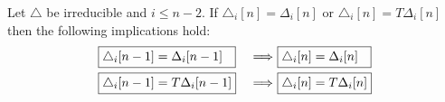 \begin{lemma}
	Let $\triangle$ be irreducible and $i \leq n-2$.
	If $\triangle_i [n] = \Delta_i [n]$ or $\triangle_i [n] = T \Delta_i [n]$ then the following implications hold:
	\begin{alignat*}{2}
	&\boxed{\triangle_i [n-1] = \Delta_i [n-1] \hspace*{7pt}}\ &\Longrightarrow\
	&\boxed{\triangle_i [n] = \Delta_i [n] \hspace*{7pt}} \\
	&\boxed{\triangle_i [n-1] = T \Delta_i [n-1]}\ &\Longrightarrow\
	&\boxed{\triangle_i [n] = T \Delta_i [n]}
	\end{alignat*}
\end{lemma}

\iffalse
\begin{proof}
	We will establish the first of these implications using proof by contradiction.
	The second is proven analogously.
	Observe that using the assumptions we have
	\begin{align*}
	(1+T) \triangle_{i-1}[n] &=
	\bd T \Delta_i [n] + \Delta_i \bd \, [n] \\ &=
	T \bd \Delta_i [n] + \bd \Delta_i [n] + \bd \Delta_i [n] + \Delta_i \bd \, [n] \\ &=
	(1+T) \bd \Delta_i [n] + (1+T) \Delta_{i-1} [n] \\ &=
	(1+T) \Delta_i \bd \, [n] + (1+T) \Delta_{i-1} [n]
	\end{align*}
	Using \eqref{e:triangle of boundary} and the definition of $\Delta_{i-1} [n]$ we have
	\begin{align*}
	(1+T) \triangle_{i-1}[n] &=
	(1+T) \sum_{\P_{n-i}^n} \left( \,
	\sum_{u \in U^1} {u.U^0} \ot {U^1} \ +
	\sum_{u \in U^0} {U^0} \ot {u.U^1} \right) \\ &+
	(1+T) \sum_{\P_{n-i+1}^n} U^0 \ot U^1.
	\end{align*}
	By \cref{l:freeness recasted} there exists functions $\eta \colon \P_{n-i}^n \to \F$ and $\zeta \colon \P_{n-i+1}^n \to \F$ such that
	\begin{align*}
	\triangle_{i-1}[n] \ &=
	\sum_{\P_{n-i}^n} \left( \,
	\sum_{u \in U^\bareta} u.U^\eta \ot U^\bareta \ +
	\sum_{u \in U^\eta} U^\eta \ot u.U^\bareta \right) \\ &+
	\sum_{\P_{n-i+1}^n} U^\zeta \ot U^\barzeta.
	\end{align*}
	But this contradicts the irreducibility of $\triangle$.
\end{proof}
\fi

